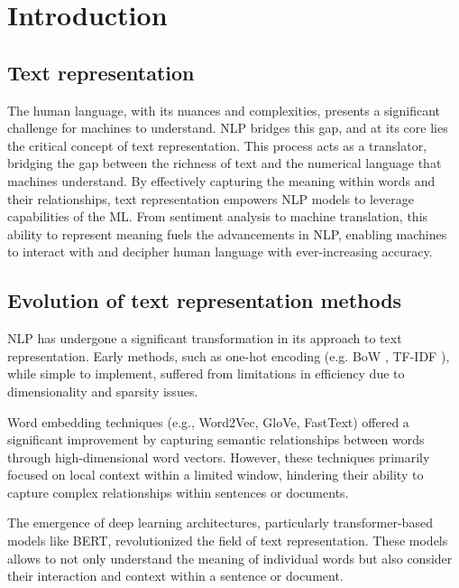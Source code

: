 
\chapter{Introduction\label{chap:introduction}}

\section{Text representation}
The human language, with its nuances and complexities, presents a significant challenge for machines to understand.
\ac{NLP} bridges this gap, and at its core lies the critical concept of text representation.
This process acts as a translator, bridging the gap between the richness of text and the numerical language that machines understand.
By effectively capturing the meaning within words and their relationships, text representation empowers \ac{NLP} models to leverage capabilities of the \ac{ML}.
From sentiment analysis to machine translation, this ability to represent meaning fuels the advancements in \ac{NLP}, enabling machines to interact with and decipher human language with ever-increasing accuracy.

\section{Evolution of text representation methods}

\ac{NLP} has undergone a significant transformation in its approach to text representation.
Early methods, such as one-hot encoding (e.g. \ac{BoW} \cite{wiki_BoW}, \ac{TF-IDF} \cite{wiki_tf_idf}), while simple to implement, suffered from limitations in efficiency due to dimensionality and sparsity issues.

Word embedding techniques (e.g., Word2Vec, \ac{GloVe}, FastText) offered a significant improvement by capturing semantic relationships between words through high-dimensional word vectors.
However, these techniques primarily focused on local context within a limited window, hindering their ability to capture complex relationships within sentences or documents.

The emergence of deep learning architectures, particularly transformer-based models like \ac{BERT}, revolutionized the field of text representation.
These models allows to not only understand the meaning of individual words but also consider their interaction and context within a sentence or document.

